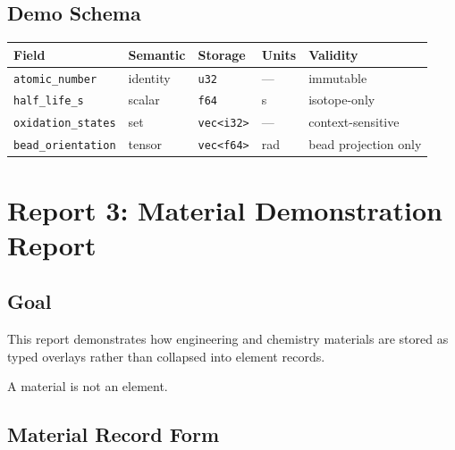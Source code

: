 \documentclass[11pt, a4paper, oneside]{article}
\newcommand{\field}[1]{\texttt{#1}}
\newcommand{\dtype}[1]{\texttt{#1}}
\begin{document}
\subsection{Demo Schema}

\begin{center}
\small
\begin{tabular}{@{} l l l l l @{}}
\toprule
\textbf{Field} & \textbf{Semantic} & \textbf{Storage} & \textbf{Units} & \textbf{Validity}\\
\midrule
\field{atomic\_number}     & identity  & \dtype{u32}        & ---   & immutable\\
\field{half\_life\_s}      & scalar    & \dtype{f64}        & s     & isotope-only\\
\field{oxidation\_states}  & set       & \dtype{vec<i32>}   & ---   & context-sensitive\\
\field{bead\_orientation}  & tensor    & \dtype{vec<f64>}   & rad   & bead projection only\\
\bottomrule
\end{tabular}
\end{center}


\section{Report 3: Material Demonstration Report}
\label{sec:report3}

\subsection{Goal}

This report demonstrates how engineering and chemistry materials are stored as
typed overlays rather than collapsed into element records.

A material is not an element.

\subsection{Material Record Form}
\end{document}
